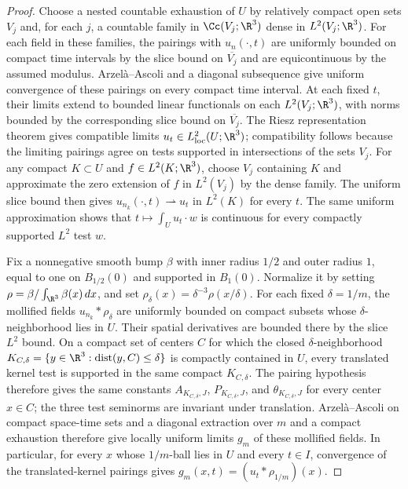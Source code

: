 \documentclass[11pt,reqno]{amsart}
\begin{document}
\begin{proof}
Choose a nested countable exhaustion of $U$ by relatively compact open sets $V_j$ and, for each $j$, a countable family in $\Cc(V_j;\R^3)$ dense in $L^2(V_j;\R^3)$. For each field in these families, the pairings with $u_n(\cdot,t)$ are uniformly bounded on compact time intervals by the slice bound on $\overline{V_j}$ and are equicontinuous by the assumed modulus. Arzel\`a--Ascoli and a diagonal subsequence give uniform convergence of these pairings on every compact time interval. At each fixed $t$, their limits extend to bounded linear functionals on each $L^2(V_j;\R^3)$, with norms bounded by the corresponding slice bound on $\overline{V_j}$. The Riesz representation theorem gives compatible limits $u_t\in L^2_{\mathrm{loc}}(U;\R^3)$; compatibility follows because the limiting pairings agree on tests supported in intersections of the sets $V_j$. For any compact $K\subset U$ and $f\in L^2(K;\R^3)$, choose $V_j$ containing $K$ and approximate the zero extension of $f$ in $L^2(V_j)$ by the dense family. The uniform slice bound then gives $u_{n_k}(\cdot,t)\rightharpoonup u_t$ in $L^2(K)$ for every $t$. The same uniform approximation shows that $t\mapsto\int_Uu_t\cdot w$ is continuous for every compactly supported $L^2$ test $w$.

Fix a nonnegative smooth bump $\beta$ with inner radius $1/2$ and outer radius $1$, equal to one on $B_{1/2}(0)$ and supported in $B_1(0)$. Normalize it by setting $\rho=\beta/\int_{\R^3}\beta(x)\,dx$, and set $\rho_\delta(x)=\delta^{-3}\rho(x/\delta)$. For each fixed $\delta=1/m$, the mollified fields $u_{n_k}*\rho_\delta$ are uniformly bounded on compact subsets whose $\delta$-neighborhood lies in $U$. Their spatial derivatives are bounded there by the slice $L^2$ bound. On a compact set of centers $C$ for which the closed $\delta$-neighborhood
$K_{C,\delta}=\{y\in\R^3:\operatorname{dist}(y,C)\le\delta\}$
is compactly contained in $U$, every translated kernel test is supported in
the same compact $K_{C,\delta}$. The pairing hypothesis therefore gives the
same constants $A_{K_{C,\delta},J}$, $P_{K_{C,\delta},J}$, and
$\theta_{K_{C,\delta},J}$ for every center $x\in C$; the three test
seminorms are invariant under translation. Arzel\`a--Ascoli on compact
space-time sets and a diagonal extraction over $m$ and a compact exhaustion
therefore give locally uniform limits $g_m$ of these mollified fields. In particular, for every $x$ whose $1/m$-ball lies in $U$ and every $t\in I$, convergence of the translated-kernel pairings gives $g_m(x,t)=(u_t*\rho_{1/m})(x)$.


\end{proof}
\end{document}
